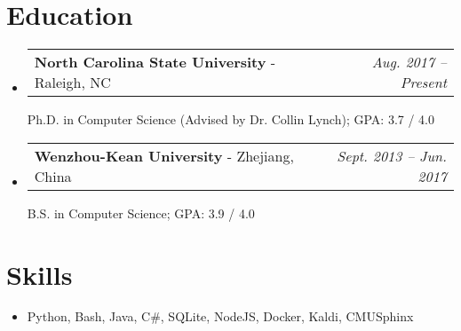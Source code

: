 \documentclass[letterpaper,11pt]{article}
\makeatletter
\newcommand{\resumeSubheading}[3]{
    \vspace{-1pt}\item
      \begin{tabular*}{0.97\textwidth}{l@{\extracolsep{\fill}}r}
        \textbf{#1} - #2  & \textit{\small #3}
      \end{tabular*}\vspace{-5pt}
  }
\newcommand{\resumeSubHeadingListStart}{\begin{itemize}[label={},leftmargin=*]}
\newcommand{\resumeSubHeadingListEnd}{\end{itemize}}
\makeatother
\begin{document}
  
  \section{Education}
    \resumeSubHeadingListStart
      \resumeSubheading
        {North Carolina State University}{Raleigh, NC}
        {Aug. 2017 -- Present}
        
        Ph.D. in Computer Science (Advised by Dr. Collin Lynch);  GPA: 3.7 / 4.0
      \resumeSubheading
        {Wenzhou-Kean University}{Zhejiang, China}
        {Sept. 2013 -- Jun. 2017}
  
        B.S. in Computer Science; GPA: 3.9 / 4.0
    \resumeSubHeadingListEnd
  
  \section{Skills}
   \resumeSubHeadingListStart
     \item{
       {Python, Bash, Java, C\#, SQLite, NodeJS, Docker, Kaldi, CMU\-Sphinx}}
   \resumeSubHeadingListEnd
  
  
\end{document}
